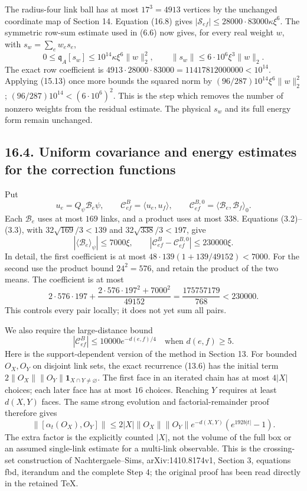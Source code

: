 \documentclass[
]{article}
\begin{document}
The radius-four link ball has at most \(17^3=4913\) vertices by the
unchanged coordinate map of Section 14. Equation (16.8) gives
\(|\mathcal S_{ef}|\le28000\cdot83000\kappa\xi^6\). The symmetric
row-sum estimate used in (6.6) now gives, for every real weight \(w\),
with \(s_w=\sum_e w_es_e\), \[
0\le\mathfrak q_A[s_w]\le10^{14}\kappa\xi^6\|w\|_2^2,
\qquad
\|s_w\|\le6\cdot10^6\xi^3\|w\|_2.                           \tag{16.10}
\] The exact row coefficient is
\(4913\cdot28000\cdot83000=11417812000000<10^{14}\). Applying (15.13)
once more bounds the squared norm by \((96/287)10^{14}\xi^6\|w\|_2^2\);
\((96/287)10^{14}<(6\cdot10^6)^2\). This is the step which removes the
number of nonzero weights from the residual estimate. The physical
\(s_w\) and its full energy form remain unchanged.

\subsection{16.4. Uniform covariance and energy estimates for the
correction
functions}\label{uniform-covariance-and-energy-estimates-for-the-correction-functions}

Put \[
u_e=Q_\psi\mathcal B_e\psi,\qquad
\mathcal C^{B}_{ef}=\langle u_e,u_f\rangle,\qquad
\mathcal C^{B,0}_{ef}=\langle\mathcal B_e,\mathcal B_f\rangle_0 .
\] Each \(\mathcal B_e\) uses at most \(169\) links, and a product uses
at most \(338\). Equations (3.2)--(3.3), with \(32\sqrt{169}/3<139\) and
\(32\sqrt{338}/3<197\), give \[
|\langle\mathcal B_e\rangle_\psi|\le7000\xi,\qquad
|\mathcal C^B_{ef}-\mathcal C^{B,0}_{ef}|\le230000\xi .
                                                               \tag{16.11}
\] In detail, the first coefficient is at most
\(48\cdot139(1+139/49152)<7000\). For the second use the product bound
\(24^2=576\), and retain the product of the two means. The coefficient
is at most \[
2\cdot576\cdot197+
 \frac{2\cdot576\cdot197^2+7000^2}{49152}
 =\frac{175757179}{768}<230000.
\] This controls every pair locally; it does not yet sum all pairs.

We also require the large-distance bound \[
|\mathcal C^B_{ef}|\le10000e^{-d(e,f)/4}
\quad\text{when }d(e,f)\ge5.                                \tag{16.12}
\] Here is the support-dependent version of the method in Section 13.
For bounded \(O_X,O_Y\) on disjoint link sets, the exact recurrence
(13.6) has the initial term
\(2\|O_X\|\|O_Y\|\mathbf1_{X\cap Y\ne\varnothing}\). The first face in
an iterated chain has at most \(4|X|\) choices; each later face has at
most \(16\) choices. Reaching \(Y\) requires at least \(d(X,Y)\) faces.
The same strong evolution and factorial-remainder proof therefore gives
\[
\|[\alpha_t(O_X),O_Y]\|
 \le2|X|\|O_X\|\|O_Y\|
      e^{-d(X,Y)}(e^{192b|t|}-1).                            \tag{16.13}
\] The extra factor is the explicitly counted \(|X|\), not the volume of
the full box or an assumed single-link estimate for a multi-link
observable. This is the crossing-set construction of Nachtergaele--Sims,
arXiv:1410.8174v1, Section 3, equations fbd, iterandum and the complete
Step 4; the original proof has been read directly in the retained TeX.
\end{document}

